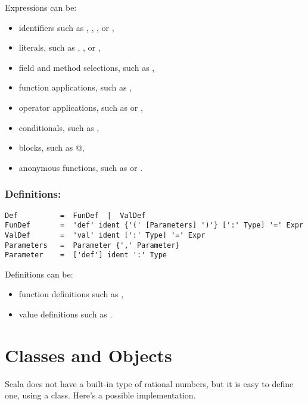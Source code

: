 Expressions can be:
\begin{itemize}
\item
identifiers such as , , \code{*}, or \code{+-},
\item
literals, such as , , or ,
\item
field and method selections, such as ,
\item
function applications, such as , 
\item
operator applications, such as  or ,
\item
conditionals, such as ,
\item
blocks, such as @,
\item
anonymous functions, such as  or .
\end{itemize}

\subsection*{Definitions:}

\begin{lstlisting}
Def          =  FunDef  |  ValDef
FunDef       =  'def' ident {'(' [Parameters] ')'} [':' Type] '=' Expr
ValDef       =  'val' ident [':' Type] '=' Expr
Parameters   =  Parameter {',' Parameter}
Parameter    =  ['def'] ident ':' Type
\end{lstlisting}
Definitions can be:
\begin{itemize}
\item
function definitions such as , 
\item
value definitions such as .
\end{itemize}

\chapter{Classes and Objects}
\label{chap:classes}

Scala does not have a built-in type of rational numbers, but it is
easy to define one, using a class. Here's a possible implementation.

